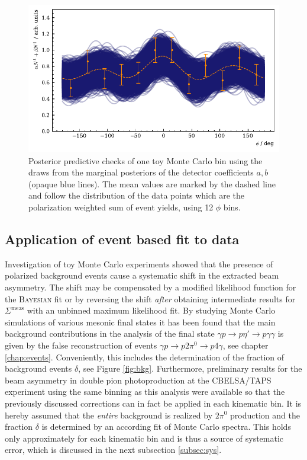 \begin{figure}[htbp]
	\centering
	\includegraphics[width=\linewidth]{../bayes/etap_event_based_fit/plots/toyMC_eff_PPC.pdf}
	\caption{Posterior predictive checks of one toy Monte Carlo bin using the draws from the marginal posteriors of the detector coefficients $a,b$ (opaque blue lines). The mean values are marked by the dashed line and follow the distribution of the data points which are the polarization weighted sum of event yields, using 12 $\phi$ bins.}	
	\label{fig:toyMC_eff}
\end{figure}
\newpage
\subsection{Application of event based fit to data}
Investigation of toy Monte Carlo experiments showed that the presence of polarized background events cause a systematic shift in the extracted beam asymmetry. The shift may be compensated by a modified likelihood function for the \textsc{Bayesian} fit or by reversing the shift \emph{after} obtaining intermediate results for $\Sigma^\text{meas}$ with an unbinned maximum likelihood fit. By studying Monte Carlo simulations of various mesonic final states it has been found that the main background contributions in the analysis of the final state $\gamma p \to p\eta'\to p\gamma\gamma$ is given by the false reconstruction of events $\gamma p \to p 2\pi^0\to p 4\gamma$, see chapter \ref{chap:events}. Conveniently, this includes the determination of the fraction of background events $\delta$, see Figure \ref{fig:bkg}. Furthermore, preliminary results for the beam asymmetry in double pion photoproduction at the CBELSA/TAPS experiment using the same binning as this analysis \cite{mahlbergphd} were available so that the previously discussed corrections can in fact be applied in each kinematic bin. It is hereby assumed that the \emph{entire} background is realized by $2\pi^0$ production and the fraction $\delta$ is determined by an according fit of Monte Carlo spectra. This holds only approximately for each kinematic bin and is thus a source of systematic error, which is discussed in the next subsection \ref{subsec:sys}.

